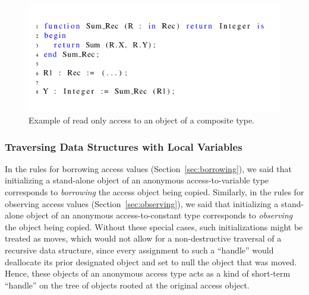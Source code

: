 \documentclass{llncs}
\begin{document}
\begin{figure}[htb!]
\centering
  \captionsetup{justification=centering,margin=0.6cm}
   \includegraphics[]{observingComposite}
   \caption{Example of read only access to an object of a composite type.}
   \label{fig:observingComposite}
\end{figure}



\subsubsection{Traversing Data Structures with Local Variables}

In the rules for borrowing access values (Section~\ref{sec:borrowing}), we said that initializing a stand-alone object of an anonymous access-to-variable type corresponds to
\textit{borrowing} the access object being copied. Similarly, in the rules for observing access values (Section~\ref{sec:observing}), we said that initializing a stand-alone object of an
anonymous access-to-constant type corresponds to \textit{observing} the object being copied. Without these special cases, such initializations might be treated as moves, which would not allow for a non-destructive
traversal of a recursive data structure, since every assignment to such a ``handle'' would
deallocate its prior designated object and set to null the object that was moved.  Hence, these objects of an anonymous access type acts as a kind of short-term ``handle'' on the tree of objects rooted at the original access object.
\end{document}
